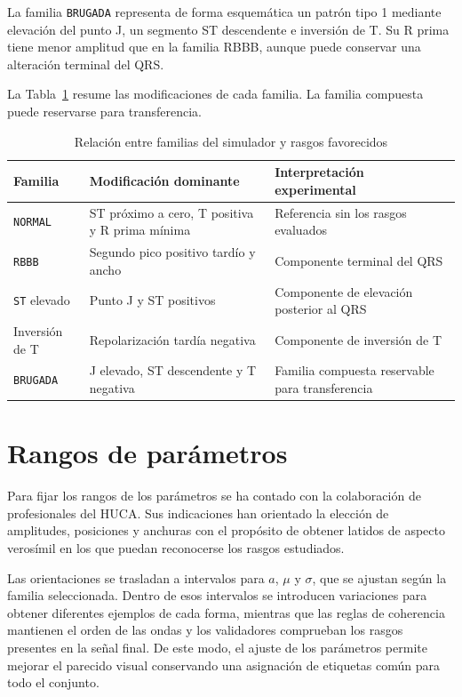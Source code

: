 La familia \texttt{BRUGADA} representa de forma esquemática un patrón tipo 1 mediante elevación del punto J, un segmento ST descendente e inversión de T. Su R prima tiene menor amplitud que en la familia RBBB, aunque puede conservar una alteración terminal del QRS.

La Tabla~\ref{tab:familias} resume las modificaciones de cada familia. La familia compuesta puede reservarse para transferencia.

\begin{table}[H]
\centering
\small
\begin{tabularx}{\textwidth}{p{3.1cm} p{4.4cm} X}
\toprule
\textbf{Familia} & \textbf{Modificación dominante} & \textbf{Interpretación experimental} \\
\midrule
\texttt{NORMAL} & ST próximo a cero, T positiva y R prima mínima & Referencia sin los rasgos evaluados \\
\texttt{RBBB} & Segundo pico positivo tardío y ancho & Componente terminal del QRS \\
\texttt{ST} elevado & Punto J y ST positivos & Componente de elevación posterior al QRS \\
Inversión de T & Repolarización tardía negativa & Componente de inversión de T \\
\texttt{BRUGADA} & J elevado, ST descendente y T negativa & Familia compuesta reservable para transferencia \\
\bottomrule
\end{tabularx}
\caption{Relación entre familias del simulador y rasgos favorecidos}
\label{tab:familias}
\end{table}

\section{Rangos de parámetros}

Para fijar los rangos de los parámetros se ha contado con la colaboración de profesionales del HUCA. Sus indicaciones han orientado la elección de amplitudes, posiciones y anchuras con el propósito de obtener latidos de aspecto verosímil en los que puedan reconocerse los rasgos estudiados.

Las orientaciones se trasladan a intervalos para \(a\), \(\mu\) y \(\sigma\), que se ajustan según la familia seleccionada. Dentro de esos intervalos se introducen variaciones para obtener diferentes ejemplos de cada forma, mientras que las reglas de coherencia mantienen el orden de las ondas y los validadores comprueban los rasgos presentes en la señal final. De este modo, el ajuste de los parámetros permite mejorar el parecido visual conservando una asignación de etiquetas común para todo el conjunto.

